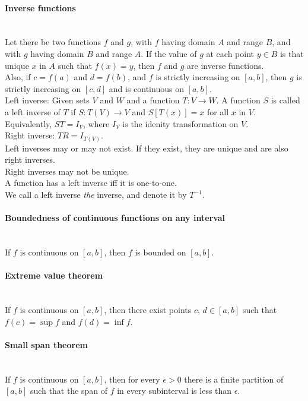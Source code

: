 \documentclass[10pt]{article}
\begin{document}
\paragraph{Inverse functions}\ \\
Let there be two functions $f$ and $g$, with $f$ having domain $A$ and range $B$,
and with $g$ having domain $B$ and range $A$.  If the value of $g$ at each point $y \in B$
is that unique $x$ in $A$ such that $f(x) = y$, then $f$ and $g$ are inverse functions.\\
Also, if $c = f(a)$ and $d = f(b)$, and $f$ is strictly increasing on $[a, b]$, then
$g$ is strictly increasing on $[c, d]$ and is continuous on $[a, b]$.\\
Left inverse: Given sets $V$ and $W$ and a function $T: V \to W$. A function $S$ is called a left
inverse of $T$ if $S: T(V) \to V$ and $S[T(x)]=x$ for all $x$ in $V$. Equivalently,
$ST = I_V$, where $I_V$ is the idenity transformation on $V$.\\
Right inverse: $TR = I_{T(V)}$.\\
Left inverses may or may not exist. If they exist, they are unique and are also right inverses.\\
Right inverses may not be unique.\\
A function has a left inverse iff it is one-to-one.\\
We call a left inverse {\it the} inverse, and denote it by $T^{-1}$.

\paragraph{Boundedness of continuous functions on any interval}\ \\
If $f$ is continuous on $[a, b]$, then $f$ is bounded on $[a,b]$.

\paragraph{Extreme value theorem}\ \\
If $f$ is continuous on $[a,b]$, then there exist points $c$, $d \in [a,b]$ 
such that $f(c) = \sup f$ and $f(d) = \inf f$.

\paragraph{Small span theorem}\ \\
If $f$ is continuous on $[a,b]$, then for every $\epsilon > 0$ there is a finite 
partition of $[a,b]$ such that the span of $f$ in every subinterval is less than $\epsilon$.
\end{document}

